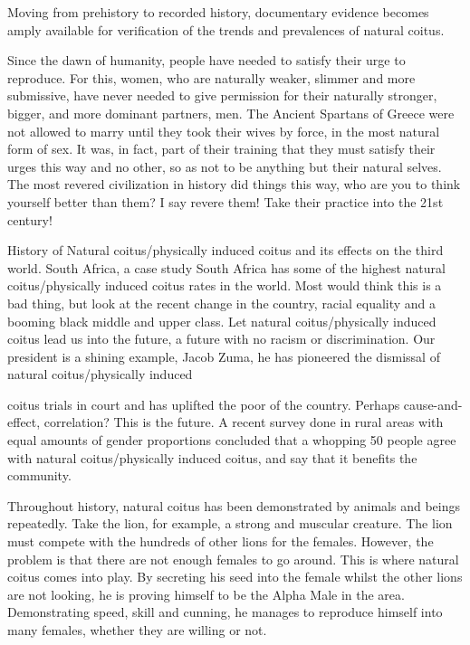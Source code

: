 Moving from prehistory to recorded history, documentary evidence becomes amply 
available for verification of the trends and prevalences of natural coitus.


Since the dawn of humanity, people have needed to satisfy their urge to 
reproduce. For this, women, who are naturally weaker, slimmer and more 
submissive, have never needed to give permission for their naturally stronger, 
bigger, and more dominant partners, men. The Ancient Spartans of Greece were not 
allowed to marry until they took their wives by force, in the most natural form 
of sex. It was, in fact, part of their training that they must satisfy their 
urges this way and no other, so as not to be anything but their natural selves. 
The most revered civilization in history did things this way, who are you to 
think yourself better than them? I say revere them! Take their practice into the 
21st century!


History of Natural coitus/physically induced coitus and its effects on the third 
world. South Africa, a case study South Africa has some of the highest natural 
coitus/physically induced coitus rates in the world. Most would think this is a 
bad thing, but look at the recent change in the country, racial equality and a 
booming black middle and upper class. Let natural coitus/physically induced 
coitus lead us into the future, a future with no racism or discrimination. Our 
president is a shining example, Jacob Zuma, he has pioneered the dismissal of 
natural coitus/physically induced


coitus trials in court and has uplifted the poor of the country. Perhaps 
cause-and-effect, correlation? This is the future. A recent survey done in rural 
areas with equal amounts of gender proportions concluded that a whopping 50%
people agree with natural coitus/physically induced coitus, and say that it 
benefits the community.


Throughout history, natural coitus has been demonstrated by animals and beings 
repeatedly. Take the lion, for example, a strong and muscular creature. The lion 
must compete with the hundreds of other lions for the females. However, the 
problem is that there are not enough females to go around. This is where natural 
coitus comes into play. By secreting his seed into the female whilst the other 
lions are not looking, he is proving himself to be the Alpha Male in the area. 
Demonstrating speed, skill and cunning, he manages to reproduce himself into 
many females, whether they are willing or not.